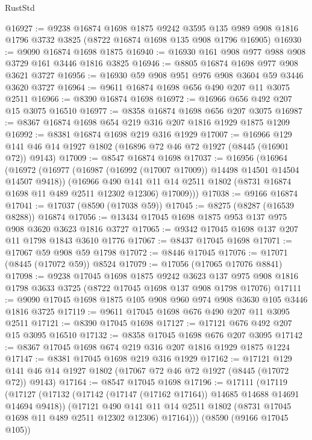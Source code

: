 \begin{lexlean}{RustStd}
\begin{coremodule}
@16927 := @9238
    @16874
    @1698
    @1875
    @9242
    @3595
    @135
    @989
    @908
    @1816
    @1796
    @3732
    @3825
    (@8722 @16874 @1698 @135 @908 @1796 @16905)
@16930 := @9090 @16874 @1698 @1875
@16940 := @16930 @161 @908 @977 @988 @908 @3729 @161 @3446 @1816 @3825
@16946 := @8805 @16874 @1698 @977 @908 @3621 @3727
@16956 := @16930 @59 @908 @951 @976 @908 @3604 @59 @3446 @3620 @3727
@16964 := @9611 @16874 @1698 @656 @490 @207 @11 @3075 @2511
@16966 := @8390 @16874 @1698
@16972 := @16966 @656 @492 @207 @15 @3075 @16510
@16977 := @8358 @16874 @1698 @656 @207 @3075
@16987 := @8367 @16874 @1698 @654 @219 @316 @207 @1816 @1929 @1875 @1209
@16992 := @8381 @16874 @1698 @219 @316 @1929
@17007 := @16966 @129 @141 @46 @14 @1927 @1802 (@16896 @72 @46 @72 @1927 (@8445 (@16901 @72)) @9143)
@17009 := @8547 @16874 @1698
@17037 := @16956
    (@16964
      (@16972
        (@16977 (@16987 (@16992 (@17007 @17009)) @14498 @14501 @14504 @14507 @9418))
        (@16966
          @490
          @141
          @11
          @14
          @2511
          @1802
          (@8731 @16874 @1698 @11 @489 @2511 @12302 @12306)
          @17009)))
@17038 := @9166 @16874
@17041 := @17037 (@8590 (@17038 @59))
@17045 := @8275 (@8287 (@16539 @8288)) @16874
@17056 := @13434 @17045 @1698 @1875 @953 @137 @975 @908 @3620 @3623 @1816 @3727
@17065 := @9342 @17045 @1698 @137 @207 @11 @1798 @1843 @3610 @1776
@17067 := @8437 @17045 @1698
@17071 := @17067 @59 @908 @59 @1798
@17072 := @8446 @17045
@17076 := @17071 (@8445 (@17072 @59)) @8524
@17079 := @17056 (@17065 @17076 @8841)
@17098 := @9238
    @17045
    @1698
    @1875
    @9242
    @3623
    @137
    @975
    @908
    @1816
    @1798
    @3633
    @3725
    (@8722 @17045 @1698 @137 @908 @1798 @17076)
@17111 := @9090 @17045 @1698 @1875 @105 @908 @960 @974 @908 @3630 @105 @3446 @1816 @3725
@17119 := @9611 @17045 @1698 @676 @490 @207 @11 @3095 @2511
@17121 := @8390 @17045 @1698
@17127 := @17121 @676 @492 @207 @15 @3095 @16510
@17132 := @8358 @17045 @1698 @676 @207 @3095
@17142 := @8367 @17045 @1698 @674 @219 @316 @207 @1816 @1929 @1875 @1224
@17147 := @8381 @17045 @1698 @219 @316 @1929
@17162 := @17121 @129 @141 @46 @14 @1927 @1802 (@17067 @72 @46 @72 @1927 (@8445 (@17072 @72)) @9143)
@17164 := @8547 @17045 @1698
@17196 := @17111
    (@17119
      (@17127
        (@17132 (@17142 (@17147 (@17162 @17164)) @14685 @14688 @14691 @14694 @9418))
        (@17121
          @490
          @141
          @11
          @14
          @2511
          @1802
          (@8731 @17045 @1698 @11 @489 @2511 @12302 @12306)
          @17164)))
    (@8590 (@9166 @17045 @105))

\end{coremodule}
\end{lexlean}
